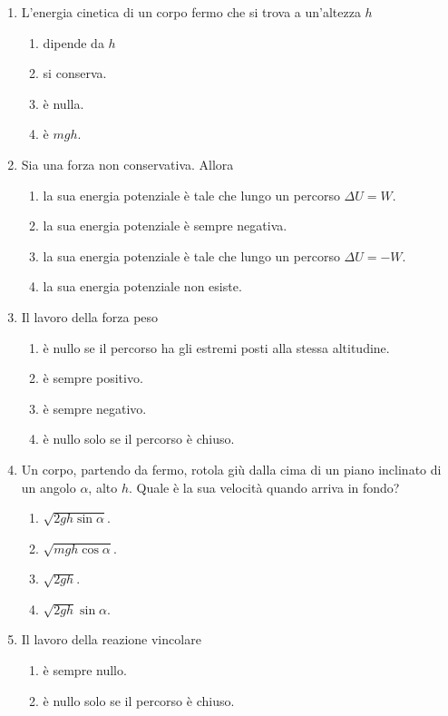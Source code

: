 \documentclass{article}
\begin{document}
\begin{enumerate}
  \item L'energia cinetica di un corpo fermo che si trova a un'altezza $h$
  \begin{enumerate}[label=\Alph*.]
    \item dipende da $h$
    \item si conserva.
    \item è nulla.
    \item è $mgh$.
  \end{enumerate}
  \item Sia  una forza non conservativa. Allora
  \begin{enumerate}[label=\Alph*.]
    \item la sua energia potenziale è tale che lungo un percorso $\Delta U=W$.
    \item la sua energia potenziale è sempre negativa.
    \item la sua energia potenziale è tale che lungo un percorso $\Delta U=-W$.
    \item la sua energia potenziale non esiste.
  \end{enumerate}
  \item Il lavoro della forza peso
  \begin{enumerate}[label=\Alph*.]
    \item è nullo se il percorso ha gli estremi posti alla stessa altitudine.
    \item è sempre positivo.
    \item è sempre negativo.
    \item è nullo solo se il percorso è chiuso.
  \end{enumerate}
  \item Un corpo, partendo da fermo, rotola giù dalla cima di un piano inclinato di un angolo $\alpha$, alto $h$. Quale è la sua velocità quando arriva in fondo?
  \begin{enumerate}[label=\Alph*.]
    \item $\sqrt{2gh\sin\alpha}$.
    \item $\sqrt{mgh\cos\alpha}$.
    \item $\sqrt{2gh}$.
    \item $\sqrt{2gh}\sin\alpha$.
  \end{enumerate}
  \item Il lavoro della reazione vincolare
  \begin{enumerate}[label=\Alph*.]
    \item è sempre nullo.
    \item è nullo solo se il percorso è chiuso.

\end{enumerate}
\end{enumerate}
\end{document}
